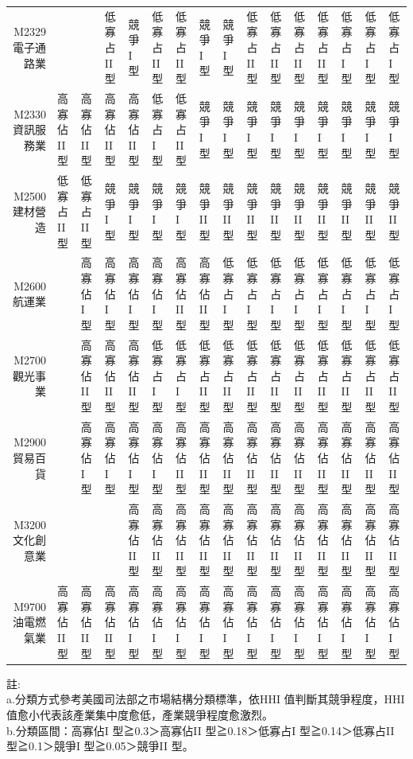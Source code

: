 \documentclass[a4paper,14pt]{article}\usepackage[]{graphicx}\usepackage[]{color}
\begin{document}
\begin{landscape}
\begin{table}[ht]
{\begin{tabular}{rlllllllllllllll}
  M2329電子通路業 &  &  & 低寡占II 型 & 競爭I 型 & 低寡占II 型 & 低寡占II 型 & 競爭I 型 & 競爭I 型 & 低寡占II 型 & 低寡占II 型 & 低寡占II 型 & 低寡占II 型 & 低寡占I 型 & 低寡占I 型 & 低寡占I 型 \\ 
  M2330資訊服務業 & 高寡佔II 型 & 高寡佔II 型 & 高寡佔II 型 & 高寡佔II 型 & 低寡占I 型 & 低寡占II 型 & 競爭I 型 & 競爭I 型 & 競爭I 型 & 競爭I 型 & 競爭I 型 & 競爭I 型 & 競爭I 型 & 競爭I 型 & 競爭I 型 \\ 
  M2500建材營造 & 低寡占II 型 & 低寡占II 型 & 競爭I 型 & 競爭I 型 & 競爭I 型 & 競爭I 型 & 競爭II 型 & 競爭II 型 & 競爭II 型 & 競爭II 型 & 競爭II 型 & 競爭II 型 & 競爭II 型 & 競爭II 型 & 競爭II 型 \\ 
  M2600航運業 &  & 高寡佔I 型 & 高寡佔I 型 & 高寡佔I 型 & 高寡佔I 型 & 高寡佔II 型 & 高寡佔II 型 & 低寡占I 型 & 低寡占I 型 & 低寡占I 型 & 低寡占I 型 & 低寡占I 型 & 低寡占I 型 & 低寡占I 型 & 低寡占I 型 \\ 
  M2700觀光事業 &  & 高寡佔II 型 & 高寡佔II 型 & 高寡佔II 型 & 低寡占I 型 & 低寡占I 型 & 低寡占II 型 & 低寡占II 型 & 低寡占II 型 & 低寡占II 型 & 低寡占II 型 & 低寡占II 型 & 低寡占II 型 & 低寡占II 型 & 低寡占II 型 \\ 
  M2900貿易百貨 &  & 高寡佔I 型 & 高寡佔I 型 & 高寡佔I 型 & 高寡佔I 型 & 高寡佔II 型 & 高寡佔II 型 & 高寡佔II 型 & 高寡佔II 型 & 高寡佔II 型 & 高寡佔II 型 & 高寡佔II 型 & 高寡佔II 型 & 高寡佔II 型 & 高寡佔II 型 \\ 
  M3200文化創意業 &  &  &  & 高寡佔II 型 & 高寡佔II 型 & 高寡佔II 型 & 高寡佔II 型 & 高寡佔II 型 & 高寡佔II 型 & 高寡佔II 型 & 高寡佔II 型 & 高寡佔II 型 & 高寡佔II 型 & 高寡佔II 型 & 高寡佔II 型 \\ 
  M9700油電燃氣業 & 高寡佔II 型 & 高寡佔II 型 & 高寡佔II 型 & 高寡佔I 型 & 高寡佔I 型 & 高寡佔I 型 & 高寡佔I 型 & 高寡佔I 型 & 高寡佔I 型 & 高寡佔I 型 & 高寡佔I 型 & 高寡佔I 型 & 高寡佔I 型 & 高寡佔I 型 & 高寡佔I 型 \\ 
   \hline
\end{tabular}
}
\end{table}


註:\\
a.分類方式參考美國司法部之市場結構分類標準，依HHI 值判斷其競爭程度，HHI 值愈小代表該產業集中度愈低，產業競爭程度愈激烈。\\
b.分類區間：高寡佔I 型≧0.3＞高寡佔II 型≧0.18＞低寡占I 型≧0.14＞低寡占II 型≧0.1＞競爭I 型≧0.05＞競爭II 型。\\
\end{landscape}
\restoregeometry
\end{document}
